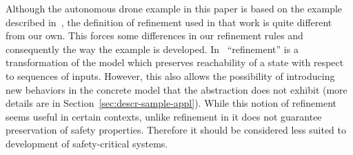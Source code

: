 Although the autonomous drone example in this paper is based on the
example described in~\cite{Syriani_2019}, the definition of refinement
used in that work is quite different from our own. This forces some
differences in our refinement rules and consequently the way the
example is developed.  In~\cite{Syriani_2019} ``refinement'' is a
transformation of the model which preserves reachability of a state
with respect to sequences of inputs. However, this also allows the
possibility of introducing new behaviors in the concrete model that
the abstraction does not exhibit (more details are in
Section~\ref{sec:descr-sample-appl}). While this notion of refinement
seems useful in certain contexts, unlike refinement in \EventB it does
not guarantee preservation of safety properties. Therefore it should
be considered less suited to development of safety-critical systems.

